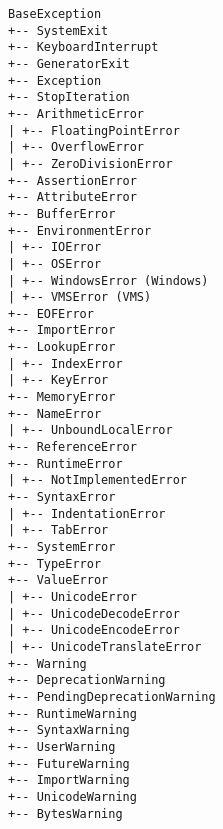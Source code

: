 \documentclass{article}
\begin{document}
\begin{multicols}{4}
\begin{verbatim}
BaseException
+-- SystemExit
+-- KeyboardInterrupt
+-- GeneratorExit
+-- Exception
+-- StopIteration
+-- ArithmeticError
| +-- FloatingPointError
| +-- OverflowError
| +-- ZeroDivisionError
+-- AssertionError
+-- AttributeError
+-- BufferError
+-- EnvironmentError
| +-- IOError
| +-- OSError
| +-- WindowsError (Windows)
| +-- VMSError (VMS)
+-- EOFError
+-- ImportError
+-- LookupError
| +-- IndexError
| +-- KeyError
+-- MemoryError
+-- NameError
| +-- UnboundLocalError
+-- ReferenceError
+-- RuntimeError
| +-- NotImplementedError
+-- SyntaxError
| +-- IndentationError
| +-- TabError
+-- SystemError
+-- TypeError
+-- ValueError
| +-- UnicodeError
| +-- UnicodeDecodeError
| +-- UnicodeEncodeError
| +-- UnicodeTranslateError
+-- Warning
+-- DeprecationWarning
+-- PendingDeprecationWarning
+-- RuntimeWarning
+-- SyntaxWarning
+-- UserWarning
+-- FutureWarning
+-- ImportWarning
+-- UnicodeWarning
+-- BytesWarning
\end{verbatim}

\end{multicols}
\end{document}
